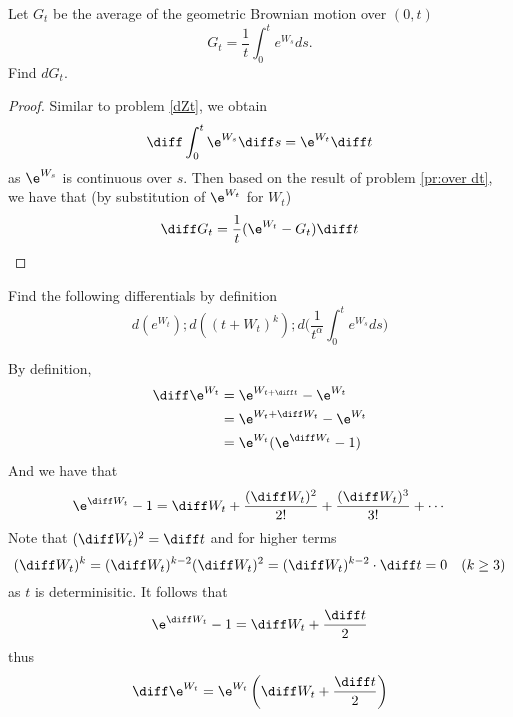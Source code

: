     \problem
    \begin{question}
        Let $G_t$ be the average of the geometric Brownian motion over $(0,t)$
        \[G_t= \frac{1}{t}\int_0^t e^{W_s}ds.\]
        Find $dG_t$.
    \end{question}
    \begin{proof}
        Similar to problem \ref{dZt},
        we obtain
        \[\diff\int_0^t\e^{W_s}\diff s=\e^{W_t}\diff t\]
        as $\e^{W_s}$ is continuous over $s$.
        Then based on the result of problem \ref{pr:over dt},
        we have that (by substitution of $\e^{W_t}$ for $W_t$)
        \[\diff G_t=\frac1t(\e^{W_t}-G_t)\diff t\]
    \end{proof}

    \problem
    \begin{question}
        Find the following differentials by definition
        \[d(e^{W_t}); d((t+W_t)^k); d\Big(\frac{1}{t^\alpha}\int_0^te^{W_s}ds\Big)\]
    \end{question}
    By definition,
    \[\begin{aligned}
        \diff\e^{W_t}&=\e^{W_{t+\diff t}}-\e^{W_t}\\
        &=\e^{W_t+\diff W_t}-\e^{W_t}\\
        &=\e^{W_t}(\e^{\diff W_t}-1)
    \end{aligned}\]
    And we have that
    \[\e^{\diff W_t}-1=\diff W_t+\frac{(\diff W_t)^2}{2!}
    +\frac{(\diff W_t)^3}{3!}+\cdots\]
    Note that $(\diff W_t)^2=\diff t$ and for higher terms
    \begin{equation}
        \label{eq:high term 0}
        (\diff W_t)^k=(\diff W_t)^{k-2}(\diff W_t)^2
        =(\diff W_t)^{k-2}\cdot\diff t=0\quad(k\geq 3)
    \end{equation}
    as $t$ is determinisitic. It follows that
    \[\e^{\diff W_t}-1=\diff W_t+\frac{\diff t}{2}\]
    thus
    \[\diff\e^{W_t}=\e^{W_t}\left(\diff W_t+\frac{\diff t}{2}\right)\]


